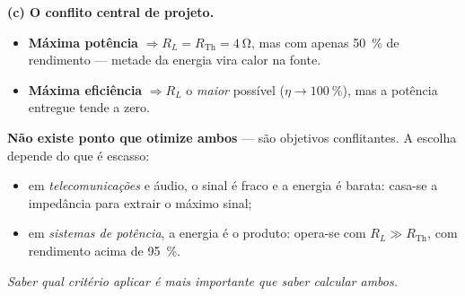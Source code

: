 \begin{questao}[3]{}
{\textbf{(c) O conflito central de projeto.}
\begin{itemize}[leftmargin=1.6em,itemsep=1pt,topsep=2pt]
\item \textbf{Máxima potência} $\Rightarrow R_L = R_{\text{Th}} = \SI{4}{\ohm}$,
      mas com apenas \SI{50}{\percent} de rendimento --- metade da energia vira
      calor na fonte.
\item \textbf{Máxima eficiência} $\Rightarrow R_L$ o \emph{maior} possível
      ($\eta \to \SI{100}{\percent}$), mas a potência entregue tende a zero.
\end{itemize}
\textbf{Não existe ponto que otimize ambos} --- são objetivos conflitantes.
A escolha depende do que é escasso:
\begin{itemize}[leftmargin=1.6em,itemsep=1pt,topsep=2pt]
\item em \emph{telecomunicações} e áudio, o sinal é fraco e a energia é barata:
      casa-se a impedância para extrair o máximo sinal;
\item em \emph{sistemas de potência}, a energia é o produto: opera-se com
      $R_L \gg R_{\text{Th}}$, com rendimento acima de \SI{95}{\percent}.
\end{itemize}
\emph{Saber qual critério aplicar é mais importante que saber calcular ambos.}}
\end{questao}

\blocodesafio

